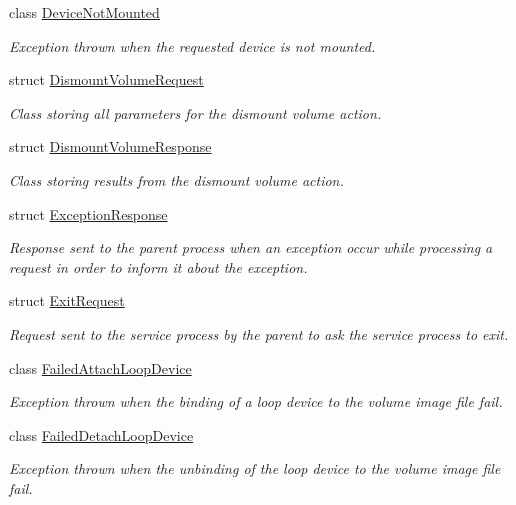 \begin{DoxyCompactItemize}
class \hyperlink{class_gost_crypt_1_1_core_1_1_device_not_mounted}{Device\+Not\+Mounted}
\begin{DoxyCompactList}\small\item\em Exception thrown when the requested device is not mounted. \end{DoxyCompactList}\item 
struct \hyperlink{struct_gost_crypt_1_1_core_1_1_dismount_volume_request}{Dismount\+Volume\+Request}
\begin{DoxyCompactList}\small\item\em Class storing all parameters for the dismount volume action. \end{DoxyCompactList}\item 
struct \hyperlink{struct_gost_crypt_1_1_core_1_1_dismount_volume_response}{Dismount\+Volume\+Response}
\begin{DoxyCompactList}\small\item\em Class storing results from the dismount volume action. \end{DoxyCompactList}\item 
struct \hyperlink{struct_gost_crypt_1_1_core_1_1_exception_response}{Exception\+Response}
\begin{DoxyCompactList}\small\item\em Response sent to the parent process when an exception occur while processing a request in order to inform it about the exception. \end{DoxyCompactList}\item 
struct \hyperlink{struct_gost_crypt_1_1_core_1_1_exit_request}{Exit\+Request}
\begin{DoxyCompactList}\small\item\em Request sent to the service process by the parent to ask the service process to exit. \end{DoxyCompactList}\item 
class \hyperlink{class_gost_crypt_1_1_core_1_1_failed_attach_loop_device}{Failed\+Attach\+Loop\+Device}
\begin{DoxyCompactList}\small\item\em Exception thrown when the binding of a loop device to the volume image file fail. \end{DoxyCompactList}\item 
class \hyperlink{class_gost_crypt_1_1_core_1_1_failed_detach_loop_device}{Failed\+Detach\+Loop\+Device}
\begin{DoxyCompactList}\small\item\em Exception thrown when the unbinding of the loop device to the volume image file fail. \end{DoxyCompactList}\item 

\end{DoxyCompactItemize}
